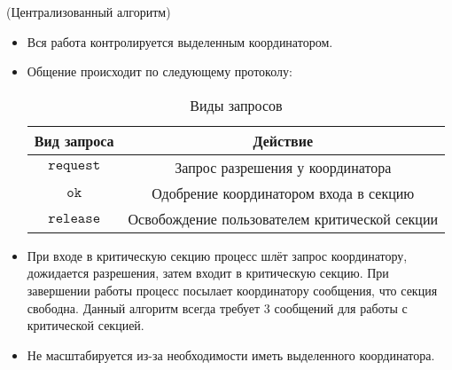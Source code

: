 \begin{algorithm}(Централизованный алгоритм)
    \begin{itemize}
        \item Вся работа контролируется выделенным координатором.
        \item Общение происходит по следующему протоколу:
            \begin{table}[!ht]
                \centering
                \begin{tabular}{|c|c|} \hline
                    Вид запроса & Действие \\ \hline
                    $\texttt{request}$ & Запрос разрешения у координатора \\ \hline
                    $\texttt{ok}$ & Одобрение координатором входа в секцию \\ \hline
                    $\texttt{release}$ & Освобождение пользователем критической 
                    секции \\ \hline
                \end{tabular}
                \caption{Виды запросов}
            \end{table}
        \item При входе в критическую секцию процесс шлёт запрос координатору,
            дожидается разрешения, затем входит в критическую секцию.
            При завершении работы процесс посылает координатору сообщения,
            что секция свободна. Данный алгоритм всегда требует 3 сообщений для
            работы с критической секцией.
        \item Не масштабируется из-за необходимости иметь выделенного координатора.
    \end{itemize}
\end{algorithm}

